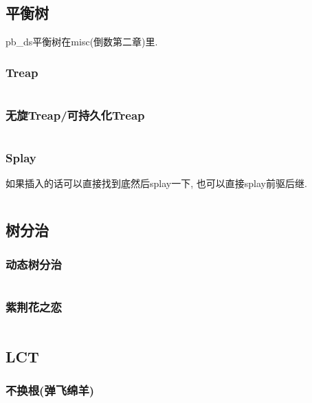 \documentclass[a4paper]{article}
\begin{document}
\begin{multicols}{2}
	
			\subsection{平衡树}
				pb\_ds平衡树在misc(倒数第二章)里.

				\subsubsection{Treap}
					\inputminted{cpp}{../src/datastructure/Treap.cpp}
					
				\subsubsection{无旋Treap/可持久化Treap}
					\inputminted{cpp}{../src/datastructure/无旋Treap.cpp}
		
		
				\subsubsection{Splay}
					如果插入的话可以直接找到底然后splay一下, 也可以直接splay前驱后继.
					\inputminted[]{cpp}{../src/datastructure/文艺平衡树.cpp}
				
				
			\subsection{树分治}

				
				\subsubsection{动态树分治}
					\inputminted{cpp}{../src/datastructure/动态树分治.cpp}

				\subsubsection{紫荆花之恋}
					\inputminted{cpp}{../src/datastructure/紫荆花之恋.cpp}
	
			\subsection{LCT}
				\subsubsection{不换根(弹飞绵羊)}
					\inputminted{cpp}{../src/datastructure/LCT(不换根).cpp}
			

\end{multicols}
\end{document}
